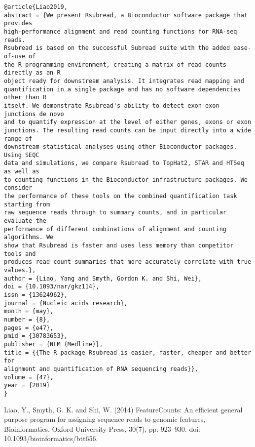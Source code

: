 \documentclass[]{article}
\begin{document}
\begin{verbatim}
@article{Liao2019,
abstract = {We present Rsubread, a Bioconductor software package that provides
high-performance alignment and read counting functions for RNA-seq reads.
Rsubread is based on the successful Subread suite with the added ease-of-use of
the R programming environment, creating a matrix of read counts directly as an R
object ready for downstream analysis. It integrates read mapping and
quantification in a single package and has no software dependencies other than R
itself. We demonstrate Rsubread's ability to detect exon-exon junctions de novo
and to quantify expression at the level of either genes, exons or exon
junctions. The resulting read counts can be input directly into a wide range of
downstream statistical analyses using other Bioconductor packages. Using SEQC
data and simulations, we compare Rsubread to TopHat2, STAR and HTSeq as well as
to counting functions in the Bioconductor infrastructure packages. We consider
the performance of these tools on the combined quantification task starting from
raw sequence reads through to summary counts, and in particular evaluate the
performance of different combinations of alignment and counting algorithms. We
show that Rsubread is faster and uses less memory than competitor tools and
produces read count summaries that more accurately correlate with true values.},
author = {Liao, Yang and Smyth, Gordon K. and Shi, Wei},
doi = {10.1093/nar/gkz114},
issn = {13624962},
journal = {Nucleic acids research},
month = {may},
number = {8},
pages = {e47},
pmid = {30783653},
publisher = {NLM (Medline)},
title = {{The R package Rsubread is easier, faster, cheaper and better for
alignment and quantification of RNA sequencing reads}},
volume = {47},
year = {2019}
}
\end{verbatim}

Liao, Y., Smyth, G. K. and Shi, W. (2014) FeatureCounts: An efficient general purpose program for assigning sequence reads to genomic features, Bioinformatics. Oxford University Press, 30(7), pp. 923–930. doi: 10.1093/bioinformatics/btt656.
\end{document}
